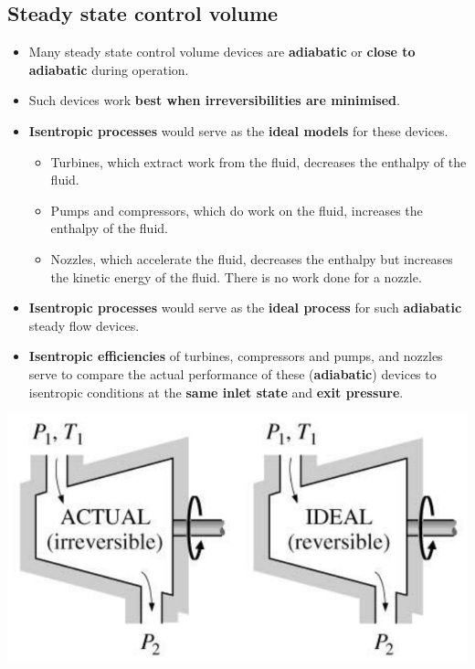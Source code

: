 \documentclass[11pt]{article}
\begin{document}
 \newpage

\subsection{Steady state control volume}
\label{sec:orgfc8189c}
\begin{itemize}
\item Many steady state control volume devices are \textbf{adiabatic} or \textbf{close to adiabatic} during operation.
\item Such devices work \textbf{best when irreversibilities are minimised}.
\item \textbf{Isentropic processes} would serve as the \textbf{ideal models} for these devices.
\begin{itemize}
\item Turbines, which extract work from the fluid, decreases the enthalpy of the fluid.
\item Pumps and compressors, which do work on the fluid, increases the enthalpy of the fluid.
\item Nozzles, which accelerate the fluid, decreases the enthalpy but increases the kinetic energy of the fluid. There is no work done for a nozzle.
\end{itemize}
\item \textbf{Isentropic processes} would serve as the \textbf{ideal process} for such \textbf{adiabatic} steady flow devices.
\item \textbf{Isentropic efficiencies} of turbines, compressors and pumps, and nozzles serve to compare the actual performance of these (\textbf{adiabatic}) devices to isentropic conditions at the \textbf{same inlet state} and \textbf{exit pressure}.
\end{itemize}

\begin{center}
\includegraphics[width=.9\linewidth]{./images/isentropic-efficiency-comparison.png}
\end{center}
\end{document}
